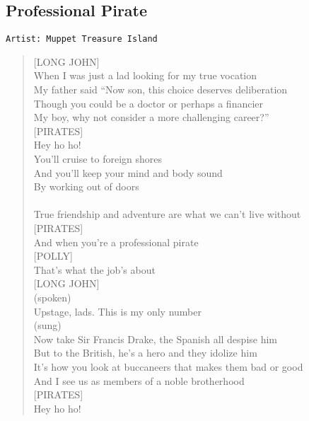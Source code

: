 \documentclass[11pt]{article}
\begin{document}
\subsection{Professional Pirate}
\label{sec:org0174072}
\begin{verbatim}
Artist: Muppet Treasure Island
\end{verbatim}
\begin{verse}
[LONG JOHN]\\
When I was just a lad looking for my true vocation\\
My father said ``Now son, this choice deserves deliberation\\
Though you could be a doctor or perhaps a financier\\
My boy, why not consider a more challenging career?''\\
\vspace*{1em}
[PIRATES]\\
Hey ho ho!\\
You'll cruise to foreign shores\\
And you'll keep your mind and body sound\\
By working out of doors\\
[LONG JOHN]\\
True friendship and adventure are what we can't live without\\
\vspace*{1em}
[PIRATES]\\
And when you're a professional pirate\\
\vspace*{1em}
[POLLY]\\
That's what the job's about\\
\vspace*{1em}
[LONG JOHN]\\
(spoken)\\
Upstage, lads. This is my only number\\
\vspace*{1em}
(sung)\\
Now take Sir Francis Drake, the Spanish all despise him\\
But to the British, he's a hero and they idolize him\\
It's how you look at buccaneers that makes them bad or good\\
And I see us as members of a noble brotherhood\\
\vspace*{1em}
[PIRATES]\\
Hey ho ho!\\

\end{verse}
\end{document}
